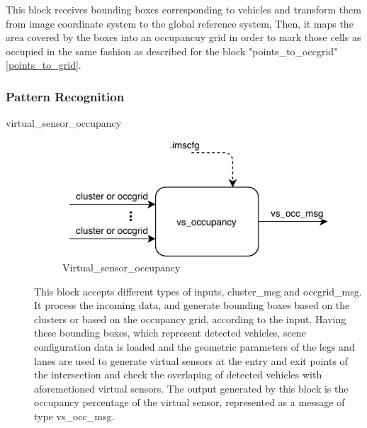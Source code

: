 \begin{description}
This block receives bounding boxes corresponding to vehicles and transform them from image coordinate system to the global reference system, Then, it maps the area covered by the boxes into an occupancuy grid in order to mark those cells as occupied in the same fashion as described for the block "points\_to\_occgrid" \ref{points_to_grid}.

\end{description}

\subsubsection{Pattern Recognition}
\begin{description}

\item[virtual\_sensor\_occupancy] \hfill

\begin{figure}[ht!]
\centering
\includegraphics[scale=1]{fig/3/vs_occ.pdf}
\caption{Virtual\_sensor\_occupancy}
\label{vehicle_counter}
\end{figure}

This block accepts different types of inputs, cluster\_msg and occgrid\_msg. It process the incoming data, and generate bounding boxes based on the clusters or based on the occupancy grid, according to the input. Having these bounding boxes, which represent detected vehicles, scene configuration data is loaded and the geometric parameters of the legs and lanes are used to generate virtual sensors at the entry and exit points of the intersection and check the overlaping of detected vehicles with aforemetioned virtual sensors. The output generated by this block is the occupancy percentage of the virtual sensor, represented as a message of type vs\_occ\_msg.


\hfill


\end{description}
